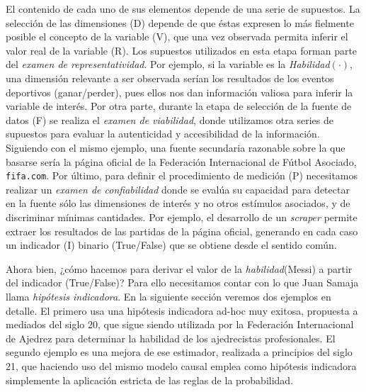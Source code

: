 \documentclass[a4paper,11pt]{book}
\theoremstyle{definition}
\begin{document}
El contenido de cada uno de sus elementos depende de una serie de supuestos.
La selección de las dimensiones (D) depende de que éstas expresen lo más fielmente posible el concepto de la variable (V), que una vez observada permita inferir el valor real de la variable (R).
%
Los supuestos utilizados en esta etapa forman parte del \emph{examen de representatividad}.
%
Por ejemplo, si la variable es la \emph{Habilidad$(\cdot)$}, una dimensión relevante a ser observada serían los resultados de los eventos deportivos (ganar/perder), pues ellos nos dan información valiosa para inferir la variable de interés.
%
Por otra parte, durante la etapa de selección de la fuente de datos (F) se realiza el \emph{examen de viabilidad}, donde utilizamos otra series de supuestos para evaluar la autenticidad y accesibilidad de la información.
%
Siguiendo con el mismo ejemplo, una fuente secundaria razonable sobre la que basarse sería la página oficial de la Federación Internacional de Fútbol Asociado, \texttt{fifa.com}.
%
Por último, para definir el procedimiento de medición (P) necesitamos realizar un \emph{examen de confiabilidad} donde se evalúa su capacidad para detectar en la fuente sólo las dimensiones de interés y no otros estímulos asociados, y de discriminar mínimas cantidades.
%
Por ejemplo, el desarrollo de un \emph{scraper} permite extraer los resultados de las partidas de la página oficial, generando en cada caso un indicador (I) binario (True/False) que se obtiene desde el sentido común.


Ahora bien, ¿cómo hacemos para derivar el valor de la \textit{habilidad}(Messi) a partir del indicador (True/False)?
%
Para ello necesitamos contar con lo que Juan Samaja llama \emph{hipótesis indicadora}.
%
%
En la siguiente sección veremos dos ejemplos en detalle.
%
El primero usa una hipótesis indicadora ad-hoc muy exitosa, propuesta a mediados del siglo 20, que sigue siendo utilizada por la Federación Internacional de Ajedrez para determinar la habilidad de los ajedrecistas profesionales.
%
El segundo ejemplo es una mejora de ese estimador, realizada a principios del siglo 21, que haciendo uso del mismo modelo causal emplea como hipótesis indicadora simplemente la aplicación estricta de las reglas de la probabilidad.
\end{document}
